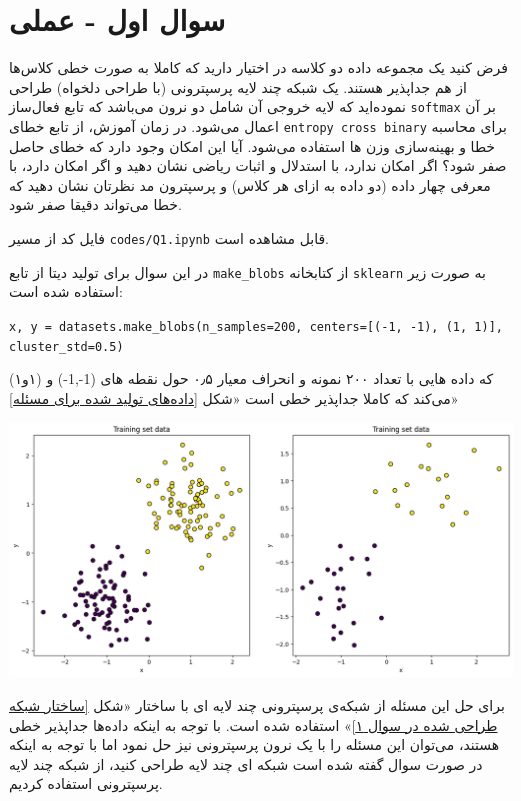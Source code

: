 \section{سوال اول - عملی}

فرض کنید یک مجموعه داده دو کلاسه در اختیار دارید که کاملا به صورت خطی کلاس‌ها از هم جداپذیر هستند. یک شبکه چند لایه پرسپترونی (با طراحی دلخواه) طراحی نموده‌اید که لایه خروجی آن شامل دو نرون می‌باشد که تابع فعال‌ساز \texttt{softmax} بر آن اعمال می‌شود. در زمان آموزش، از تابع خطای \texttt{entropy cross binary} برای محاسبه خطا و بهینه‌سازی وزن ها استفاده می‌شود. آیا این امکان وجود دارد که خطای حاصل صفر شود؟ اگر امکان ندارد، با استدلال و اثبات ریاضی نشان دهید و اگر امکان دارد، با معرفی چهار داده (دو داده به ازای هر کلاس) و پرسپترون مد نظرتان نشان دهید که خطا می‌تواند دقیقا صفر شود.


\begin{qsolve}
	فایل کد از مسیر \texttt{codes/Q1.ipynb} قابل مشاهده است.
	
	
	در این سوال برای تولید دیتا از تابع \texttt{make\_blobs} از کتابخانه \texttt{sklearn} به صورت زیر استفاده شده است:‌
	
	\begin{latin}
		\texttt{x, y = datasets.make\_blobs(n\_samples=200, centers=[(-1, -1), (1, 1)], cluster\_std=0.5)}
	\end{latin}
	
	که داده هایی با تعداد ۲۰۰ نمونه و انحراف معیار ۰٫۵ حول نقطه های (1-,1-) و (۱و۱) می‌کند که کاملا جداپذیر خطی است «شکل \ref{داده‌های تولید شده برای مسئله}»
	
	\begin{center}
		\includegraphics*[width=1\linewidth]{pics/img1.png}
		\label{داده‌های تولید شده برای مسئله}
	\end{center}
	
	
	برای حل این مسئله از شبکه‌ی پرسپترونی چند لایه ای با ساختار «شکل \ref{ساختار شبکه طراحی شده در سوال ۱}» استفاده شده است. با توجه به اینکه داده‌ها جداپذیر خطی هستند، می‌توان این مسئله را با یک نرون پرسپترونی نیز حل نمود اما با توجه به اینکه در صورت سوال گفته شده است شبکه ای چند لایه طراحی کنید، از شبکه چند لایه پرسپترونی استفاده کردیم.
\end{qsolve}




